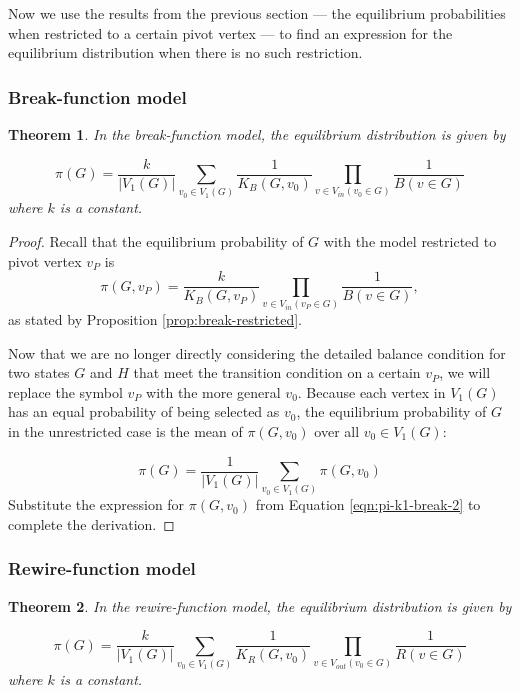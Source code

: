 \documentclass[a4paper,10pt]{article}
\newtheorem{theorem}{Theorem}
\begin{document}
Now we use the results from the previous section --- the equilibrium probabilities when restricted to a certain pivot vertex --- to find an expression for the equilibrium distribution when there is no such restriction.

\subsubsection{Break-function model}
\begin{theorem} 
In the break-function model, the equilibrium distribution is given by 

 \begin{equation}
 \label{eqn:pi-break}
  \pi(G) = \frac{k}{|V_1(G)|} \sum\limits_{v_0 \in V_1(G)} 
\frac{1}{K_B(G, v_0)} 
 \prod \limits_{v \in V_{in}(v_0 \in G)} \frac{1}{B(v \in G)}
 \end{equation}
where $k$ is a constant.
\end{theorem}

\begin{proof}
Recall that the equilibrium probability of $G$ with the model restricted to pivot vertex $v_P$ is
 \begin{equation}
 \label{eqn:pi-k1-break-2}
  \pi(G, v_P) = \frac{k}{K_B(G, v_P)} 
 \prod \limits_{v \in V_{in}(v_P \in G)} \frac{1}{B(v \in G)},
 \end{equation}
as stated by Proposition \ref{prop:break-restricted}.

Now that we are no longer directly considering the detailed balance condition for two states $G$ and $H$ that meet the transition condition on a certain $v_P$, we will replace the symbol $v_P$ with the more general $v_0$. Because each vertex in $V_1(G)$ has an equal probability of being selected as $v_0$, the equilibrium probability of $G$ in the unrestricted case is the mean of $\pi(G, v_0)$ over all $v_0 \in V_1(G)$:

\begin{equation}
   \pi(G) = \frac{1}{|V_1(G)|} \sum\limits_{v_0 \in V_1(G)} 
 \pi(G, v_0)
\end{equation}
Substitute the expression for $\pi(G, v_0)$ from Equation \ref{eqn:pi-k1-break-2} to complete the derivation.

\end{proof}

\subsubsection{Rewire-function model}
\begin{theorem} 
In the rewire-function model, the equilibrium distribution is given by 

 \begin{equation}
 \label{eqn:pi-rewire}
  \pi(G) = \frac{k}{|V_1(G)|} \sum\limits_{v_0 \in V_1(G)} 
\frac{1}{K_R(G, v_0)} 
 \prod \limits_{v \in V_{out}(v_0 \in G)} \frac{1}{R(v \in G)}
 \end{equation}
where $k$ is a constant.
\end{theorem}
\end{document}
